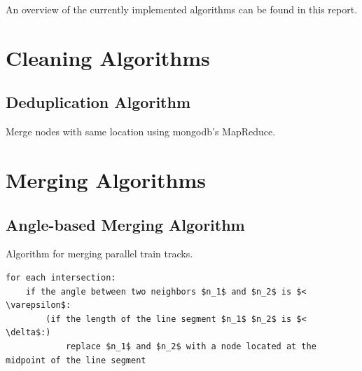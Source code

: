 \documentclass[twoside]{scrartcl}
\begin{document}
\noindent An overview of the currently implemented algorithms can be found
in this report.
\section{Cleaning Algorithms}
\subsection{Deduplication Algorithm}
Merge nodes with same location using mongodb's MapReduce.

\section{Merging Algorithms}
\subsection{Angle-based Merging Algorithm}
Algorithm for merging parallel train tracks.
\begin{lstlisting}[mathescape]
for each intersection:
    if the angle between two neighbors $n_1$ and $n_2$ is $< \varepsilon$:
        (if the length of the line segment $n_1$ $n_2$ is $<  \delta$:)
            replace $n_1$ and $n_2$ with a node located at the midpoint of the line segment
\end{lstlisting}
\end{document}
